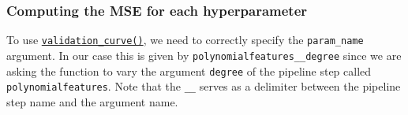 \documentclass{scrartcl}
\begin{document}
    \hypertarget{computing-the-mse-for-each-hyperparameter}{%
\subsubsection*{Computing the MSE for each
hyperparameter}\label{computing-the-mse-for-each-hyperparameter}}

To use
\href{https://scikit-learn.org/stable/modules/generated/sklearn.model_selection.validation_curve.html}{\texttt{validation\_curve()}},
we need to correctly specify the \texttt{param\_name} argument. In our
case this is given by
\texttt{\textquotesingle{}polynomialfeatures\_\_degree\textquotesingle{}}
since we are asking the function to vary the argument \texttt{degree} of
the pipeline step called \texttt{polynomialfeatures}. Note that the
\texttt{\_\_} serves as a delimiter between the pipeline step name and
the argument name.
\end{document}
